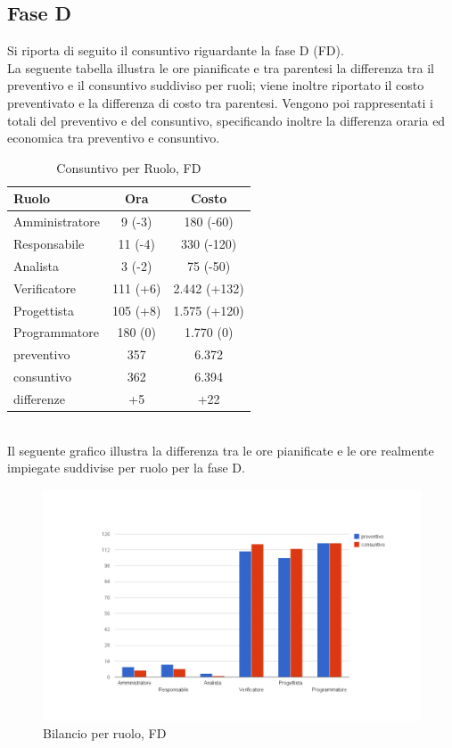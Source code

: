 \subsection{Fase D}
\label{consuntivoD}
	Si riporta di seguito il consuntivo riguardante la fase D (FD).
	\\ La seguente tabella illustra le ore pianificate e tra parentesi la differenza tra il preventivo e il consuntivo suddiviso per ruoli; viene inoltre riportato il costo preventivato e la differenza di costo tra parentesi. Vengono poi rappresentati i totali del preventivo e del consuntivo, specificando inoltre la differenza oraria ed economica tra preventivo e consuntivo.
	\begin{table}[!h]
		\centering
		\begin{tabular}{|l|c|c|}
			\hline
			Ruolo & Ora & Costo\\
			\hline
			Amministratore & 9 (-3) & 180 (-60)\\
			Responsabile & 11 (-4) & 330 (-120)\\
			Analista & 3 (-2) & 75 (-50)\\
			Verificatore & 111 (+6) & 2.442 (+132)\\
			Progettista & 105 (+8) & 1.575 (+120)\\
			Programmatore & 180 (0) & 1.770 (0)\\	
			\hline
			preventivo & 357 & 6.372\\
			consuntivo & 362 & 6.394\\
			differenze & +5 & +22 \\
			\hline			
		\end{tabular}
		\caption{Consuntivo per Ruolo, FD}
	\end{table}
	\\Il seguente grafico illustra la differenza tra le ore pianificate e le ore realmente impiegate suddivise per ruolo per la fase D.
\begin{figure}[h]
	\centering
	\includegraphics[width=1\textwidth] {./content/Immagini/consD.png}
	\caption{Bilancio per ruolo, FD}
	\label{bilD}
\end{figure}	 
